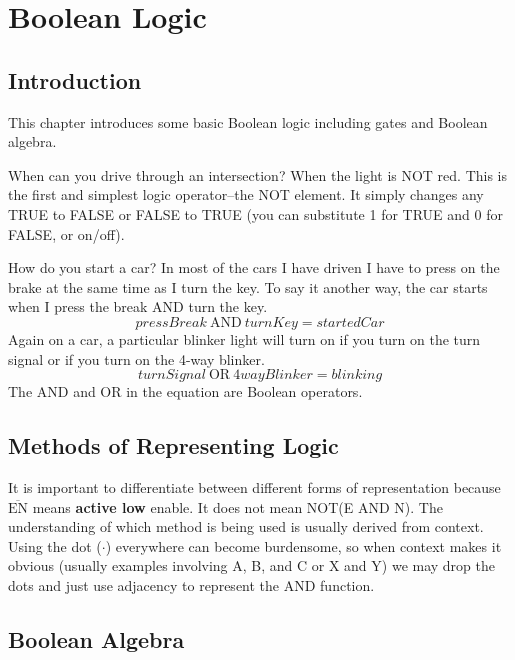 \chapter{Boolean Logic}

\section{Introduction}
This chapter introduces some basic Boolean logic including gates and Boolean algebra.

When can you drive through an intersection? When the light is NOT red. This is the first and simplest
logic operator--the NOT element. It simply changes any TRUE to FALSE or FALSE to TRUE (you can substitute
1 for TRUE and 0 for FALSE, or on/off).

How do you start a car? In most of the cars I have driven I have to press on the brake at the 
same time as I turn the key. To say it another way, the car starts when I press the break
AND turn the key.
\begin{equation}
	pressBreak \: \mathrm{AND} \: turnKey = startedCar
\end{equation}
Again on a car, a particular blinker light will turn on if you turn on the turn signal or if you turn on the 4-way blinker.
\begin{equation}
	turnSignal \: \mathrm{OR} \: 4wayBlinker = blinking
\end{equation}
The AND and OR in the equation are Boolean operators. 

\section{Methods of Representing Logic}
It is important to differentiate between different forms of representation because $\overline{\mathrm{EN}}$
means \textbf{active low} enable. It does not mean NOT(E AND N). The understanding of which method is being 
used is usually derived from context. Using the dot ($\cdot$) everywhere can become burdensome, so when context
makes it obvious (usually examples involving A, B, and C or X and Y) we may drop the dots and just use adjacency to represent
the AND function.

\section{Boolean Algebra}

